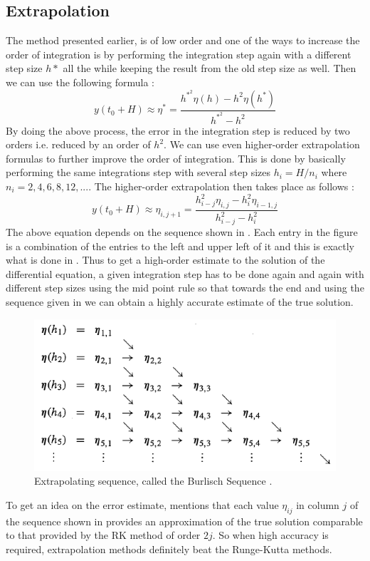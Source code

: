 \subsection{Extrapolation}
The method presented earlier, is of low order and one of the ways to increase the order of integration is by performing the integration step again with a different step size $h*$ all the while keeping the result from the old step size as well. Then we can use the following formula \cite{gillbook}:
\begin{equation}
y(t_0 +H) \approx \eta^* = \frac{h^{*^2}\eta(h) - h^2\eta(h^*)}{h^{*^2} - h^2}
\end{equation}
%
By doing the above process, the error in the integration step is reduced by two orders i.e. reduced by an order of $h^2$. We can use even higher-order extrapolation formulas to further improve the order of integration. This is done by basically performing the same integrations step with several step sizes $h_i = H/n_i$ where $n_i = 2,4,6,8,12,...$. The higher-order extrapolation then takes place as follows \cite{gillbook}:
\begin{equation}
\label{extrapol}
y(t_0 +H) \approx \eta_{i,j+1} = \frac{h_{i-j}^2\eta_{i,j} - h_i^2\eta_{i-1,j}}{h_{i-j}^2 - h_i^2}
\end{equation}
%
The above equation depends on the sequence shown in . Each entry in the figure is a combination of the entries to the left and upper left of it and this is exactly what is done in . Thus to get a high-order estimate to the solution of the differential equation, a given integration step has to be done again and again with different step sizes using the mid point rule so that towards the end and using the sequence given in  we can obtain a highly accurate estimate of the true solution.
%
\begin{figure}[h]
\centering
\captionsetup{justification=centering}
\includegraphics[scale=1]{seq.png}
\caption{Extrapolating sequence, called the Burlisch Sequence \cite{gillbook}.}
\label{fig:seq}
\end{figure}
\FloatBarrier
%
To get an idea on the error estimate, \cite{gillbook} mentions that each value $\eta_{ij}$ in column $j$ of the sequence shown in  provides an approximation of the true solution comparable to that provided by the \gls{RK} method of order $2j$. So when high accuracy is required, extrapolation methods definitely beat the Runge-Kutta methods.

